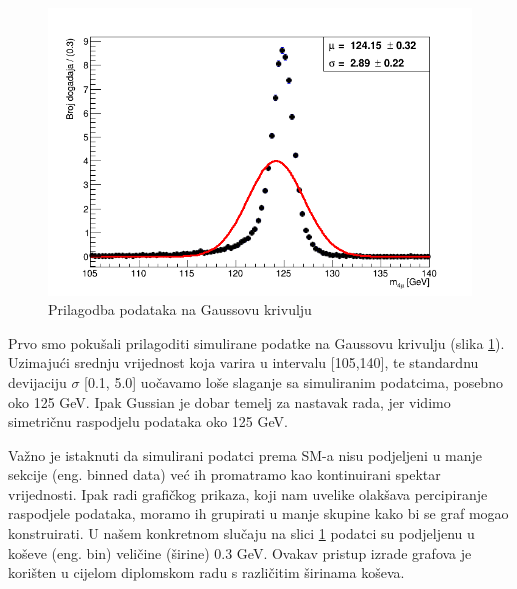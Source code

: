 \documentclass[12pt,a4paper,oneside]{article}
\begin{document}
\begin{linenumbers}
		\begin{figure}[H]
			\centering
			\includegraphics[width=1.0\textwidth]{gauss-fit-23-7-final-weighted.png}
			\caption[Saturn viđen u ultraljubičastom svjetlu.]{\label{sl:gauss-fit} Prilagodba podataka na Gaussovu krivulju}
		\end{figure}
		Prvo smo pokušali prilagoditi simulirane podatke na Gaussovu krivulju (slika \ref{sl:gauss-fit}). Uzimajući srednju vrijednost koja varira u intervalu [105,140], te standardnu devijaciju $\sigma$ [0.1, 5.0] uočavamo loše slaganje sa simuliranim podatcima, posebno oko 125 GeV. Ipak Gussian je dobar temelj za nastavak rada, jer vidimo simetričnu raspodjelu podataka oko 125 GeV.
		
		Važno je istaknuti da simulirani podatci prema SM-a nisu podjeljeni u manje sekcije (eng. binned data) već ih promatramo kao kontinuirani spektar vrijednosti. Ipak radi grafičkog prikaza, koji nam uvelike olakšava percipiranje raspodjele podataka, moramo ih grupirati u manje skupine kako bi se graf mogao konstruirati. U našem konkretnom slučaju na slici \ref{sl:gauss-fit} podatci su podjeljenu u koševe (eng. bin)  veličine (širine) 0.3 GeV. Ovakav pristup izrade grafova je korišten u cijelom diplomskom radu s različitim širinama koševa.
		

\end{linenumbers}
\end{document}
